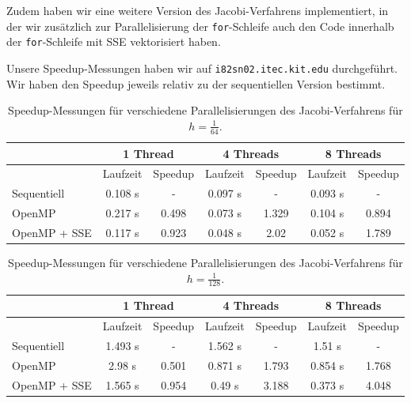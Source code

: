 \documentclass{article}
\begin{document}
Zudem haben wir eine weitere Version des Jacobi-Verfahrens implementiert, in der wir zusätzlich zur Parallelisierung der \texttt{for}-Schleife auch den Code innerhalb der \texttt{for}-Schleife mit SSE vektorisiert haben.

Unsere Speedup-Messungen haben wir auf \texttt{i82sn02.itec.kit.edu} durchgeführt. Wir haben den Speedup jeweils relativ zu der sequentiellen Version bestimmt.

\begin{table}[h!]
\centering
\small
\begin{tabular}{p{1.5cm}|c|c|c|c|c|c}
 & \multicolumn{2}{c|}{1 Thread} & \multicolumn{2}{c|}{4 Threads} & \multicolumn{2}{c}{8 Threads} \\ 
\hline 
 & Laufzeit & Speedup & Laufzeit & Speedup & Laufzeit & Speedup \\ 
\hline 
Sequentiell & 0.108 s & - & 0.097 s & - & 0.093 s & - \\
\hline
OpenMP & 0.217 s & 0.498 & 0.073 s & 1.329 & 0.104 s & 0.894 \\ 
\hline
OpenMP + SSE & 0.117 s & 0.923 & 0.048 s & 2.02 & 0.052 s & 1.789 \\ 
\hline 
\end{tabular}
\caption{\small{Speedup-Messungen für verschiedene Parallelisierungen des Jacobi-Verfahrens für $h=\frac{1}{64}$.}}
\end{table}

\begin{table}[h!]
\centering
\small
\begin{tabular}{p{1.5cm}|c|c|c|c|c|c}
 & \multicolumn{2}{c|}{1 Thread} & \multicolumn{2}{c|}{4 Threads} & \multicolumn{2}{c}{8 Threads} \\ 
\hline 
 & Laufzeit & Speedup & Laufzeit & Speedup & Laufzeit & Speedup\\ 
\hline 
Sequentiell & 1.493 s & - & 1.562 s & - & 1.51 s & - \\
\hline
OpenMP & 2.98 s & 0.501 & 0.871 s & 1.793 & 0.854 s & 1.768 \\ 
\hline
OpenMP + SSE & 1.565 s & 0.954 & 0.49 s & 3.188 & 0.373 s & 4.048 \\ 
\hline 
\end{tabular}
\caption{\small{Speedup-Messungen für verschiedene Parallelisierungen des Jacobi-Verfahrens für $h=\frac{1}{128}$.}}
\end{table}
\end{document}
